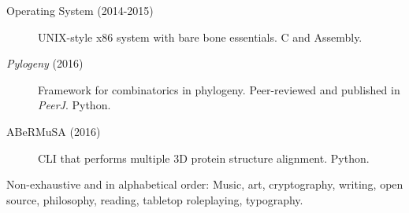 \documentclass[10pt,a4paper]{article}
\begin{document}

\spacedhrule{1.6em}{-0.4em} %



\begin{description}
\item [Operating System (2014-2015)] UNIX-style x86 system with bare bone essentials. C and Assembly.
\item [\textit{Pylogeny} (2016)] Framework for combinatorics in phylogeny. Peer-reviewed and published in \textit{PeerJ}. Python.
\item [ABeRMuSA (2016)] CLI that performs multiple 3D protein structure alignment. Python.
\end{description}


\spacedhrule{1.6em}{-0.4em} %



\inlineheadsection %
{Non-exhaustive and in alphabetical order:}
{Music, art, cryptography, writing, open source, philosophy, reading, tabletop roleplaying, typography.}
\end{document}
